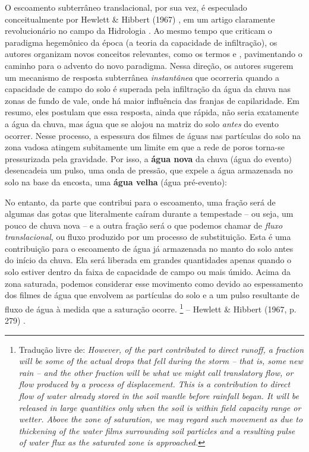 \documentclass[./main.tex]{subfiles}
\begin{document}
\par O escoamento subterrâneo translacional, por sua vez, é especulado conceitualmente por Hewlett \& Hibbert (1967) \cite{Hewlett1967}, em um artigo claramente revolucionário no campo da Hidrologia \cite{McDonnell2009}. Ao mesmo tempo que criticam o \gls{paradigma} hegemônico da época (a teoria da capacidade de infiltração), os autores organizam novos conceitos relevantes, como os termos  e , pavimentando o caminho para o advento do novo \gls{paradigma}. Nessa direção, os autores sugerem um mecanismo de resposta subterrânea \textit{instantânea} que ocorreria quando a capacidade de campo do solo é superada pela infiltração da água da chuva nas zonas de fundo de vale, onde há maior influência das franjas de capilaridade. Em resumo, eles postulam que essa resposta, ainda que rápida, não seria exatamente a água da chuva, mas água que se alojou na matriz do solo \textit{antes} do evento ocorrer. Nesse processo, a espessura dos filmes de águas nas partículas do solo na zona vadosa atingem subitamente um limite em que a rede de poros torna-se pressurizada pela gravidade. Por isso, a \textbf{água nova} da chuva (água do evento) desencadeia um pulso, uma onda de pressão, que expele a água armazenada no solo na base da encosta, uma \textbf{água velha} (água pré-evento):

\begin{adjustwidth}{100pt}{0pt}
\medskip
\small
No entanto, da parte que contribui para o escoamento, uma fração será de algumas das gotas que literalmente caíram durante a tempestade -- ou seja, um pouco de chuva nova -- e a outra fração será o que podemos chamar de \textit{fluxo translacional}, ou fluxo produzido por um processo de substituição. Esta é uma contribuição para o escoamento de água já armazenada no manto do solo antes do início da chuva. Ela será liberada em grandes quantidades apenas quando o solo estiver dentro da faixa de capacidade de campo ou mais úmido. Acima da zona saturada, podemos considerar esse movimento como devido ao espessamento dos filmes de água que envolvem as partículas do solo e a um pulso resultante de fluxo de água à medida que a saturação ocorre.
\footnote{Tradução livre de: 
\textit{
However, of the part contributed to direct runoff, a fraction will be some of the actual drops that fell during the storm -- that is, some new rain -- and the other fraction will be what we might call translatory flow, or flow produced by a process of displacement. This is a contribution to direct flow of water already stored in the soil mantle before rainfall began. It will be released in large quantities only when the soil is within field capacity range or wetter. Above the zone of saturation, we may regard such movement as due to thickening of the water films surrounding soil particles and a resulting pulse of water flux as the saturated zone is approached.
}} -- Hewlett \& Hibbert (1967, p. 279) \cite{Hewlett1967}.
\medskip
\end{adjustwidth}
\end{document}
